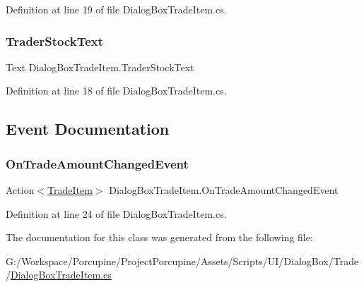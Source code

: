 Definition at line 19 of file Dialog\+Box\+Trade\+Item.\+cs.

\mbox{\label{class_dialog_box_trade_item_ab7639573ce56c103cca58a47c99bad81}} 
\subsubsection{\texorpdfstring{Trader\+Stock\+Text}{TraderStockText}}
{\footnotesize\ttfamily Text Dialog\+Box\+Trade\+Item.\+Trader\+Stock\+Text}



Definition at line 18 of file Dialog\+Box\+Trade\+Item.\+cs.



\subsection{Event Documentation}
\mbox{\label{class_dialog_box_trade_item_a2e95728cf97c625c7327d49ce609f66c}} 
\subsubsection{\texorpdfstring{On\+Trade\+Amount\+Changed\+Event}{OnTradeAmountChangedEvent}}
{\footnotesize\ttfamily Action$<$\hyperlink{class_trade_item}{Trade\+Item}$>$ Dialog\+Box\+Trade\+Item.\+On\+Trade\+Amount\+Changed\+Event}



Definition at line 24 of file Dialog\+Box\+Trade\+Item.\+cs.



The documentation for this class was generated from the following file\+:\begin{DoxyCompactItemize}
\item 
G\+:/\+Workspace/\+Porcupine/\+Project\+Porcupine/\+Assets/\+Scripts/\+U\+I/\+Dialog\+Box/\+Trade/\hyperlink{_dialog_box_trade_item_8cs}{Dialog\+Box\+Trade\+Item.\+cs}\end{DoxyCompactItemize}
